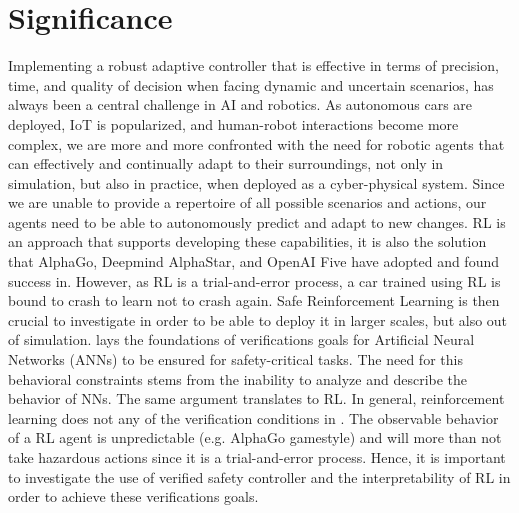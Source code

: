 \documentclass[a4paper,11pt]{article}
\begin{document}
\section{Significance}
Implementing a robust adaptive controller that is effective in terms of precision, time, and quality of decision
when facing dynamic and uncertain scenarios, has always been a central challenge in AI and robotics.
As autonomous cars are deployed, IoT is popularized, and human-robot interactions become more complex, we
are more and more confronted with the need for robotic agents that can effectively and continually adapt
to their surroundings, not only in simulation, but also in practice, when deployed as a cyber-physical system. 
Since we are unable to provide a repertoire of all possible scenarios and actions,
our agents need to be able to autonomously predict and adapt to new changes. RL is an approach that
supports developing these capabilities, it is also the solution that AlphaGo, Deepmind AlphaStar, and OpenAI Five have
adopted \cite{li2019reinforcement} and found success in. 
However, as RL is a trial-and-error process, a car trained using RL is bound to crash to learn not to crash again. Safe Reinforcement Learning is then crucial 
to investigate in order to be able to deploy it in larger scales, but also out of simulation. 
\cite{kurdkelly2003} lays the foundations of verifications goals for Artificial Neural Networks (ANNs) to be ensured for safety-critical tasks. The need for this behavioral constraints stems from the inability to analyze and 
describe the behavior of NNs. The same argument translates to RL. In general, reinforcement learning does not any of the verification conditions in \cite{kurdkelly2003}. 
The observable behavior of a RL agent is unpredictable (e.g. AlphaGo gamestyle) and will more than not take hazardous actions since it is a trial-and-error process. Hence, it is important to investigate
the use of verified safety controller and the interpretability of RL in order to achieve these verifications goals.  
\end{document}
